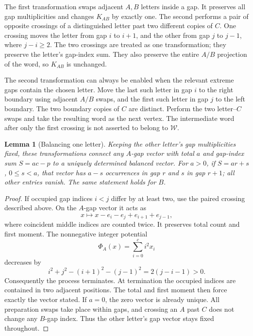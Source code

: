 \documentclass[11pt,letterpaper]{article}
\newtheorem{lemma}[theorem]{Lemma}
\theoremstyle{definition}
\theoremstyle{remark}
\begin{document}
The first transformation swaps adjacent $A,B$ letters inside a gap. It preserves all gap multiplicities and changes $K_{AB}$ by exactly one. The second performs a pair of opposite crossings of a distinguished letter past two different copies of $C$. One crossing moves the letter from gap $i$ to $i+1$, and the other from gap $j$ to $j-1$, where $j-i\ge2$. The two crossings are treated as one transformation; they preserve the letter's gap-index sum. They also preserve the entire $A/B$ projection of the word, so $K_{AB}$ is unchanged.

The second transformation can always be enabled when the relevant extreme gaps contain the chosen letter. Move the last such letter in gap $i$ to the right boundary using adjacent $A/B$ swaps, and the first such letter in gap $j$ to the left boundary. The two boundary copies of $C$ are distinct. Perform the two letter--$C$ swaps and take the resulting word as the next vertex. The intermediate word after only the first crossing is not asserted to belong to $\mathcal W$.

\begin{lemma}[Balancing one letter]\label{gts:po:lem:balance}
Keeping the other letter's gap multiplicities fixed, these transformations connect any $A$-gap vector with total $a$ and gap-index sum $S=ac-p$ to a uniquely determined balanced vector. For $a>0$, if $S=ar+s$, $0\le s<a$, that vector has $a-s$ occurrences in gap $r$ and $s$ in gap $r+1$; all other entries vanish. The same statement holds for $B$.
\end{lemma}
\begin{proof}
If occupied gap indices $i<j$ differ by at least two, use the paired crossing described above. On the $A$-gap vector it acts as
\[
 x\longmapsto x-e_i-e_j+e_{i+1}+e_{j-1},
\]
where coincident middle indices are counted twice. It preserves total count and first moment. The nonnegative integer potential
\[
 \Phi_A(x)=\sum_{i=0}^c i^2 x_i
\]
decreases by
\[
 i^2+j^2-(i+1)^2-(j-1)^2=2(j-i-1)>0.
\]
Consequently the process terminates. At termination the occupied indices are contained in two adjacent positions. The total and first moment then force exactly the vector stated. If $a=0$, the zero vector is already unique. All preparation swaps take place within gaps, and crossing an $A$ past $C$ does not change any $B$-gap index. Thus the other letter's gap vector stays fixed throughout.
\end{proof}
\end{document}
